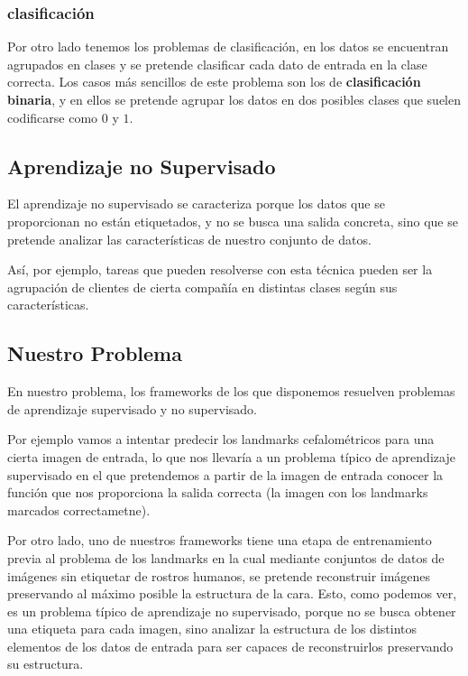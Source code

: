        \subsubsection{clasificación}
            \noindent Por otro lado tenemos los problemas de clasificación, en los datos se encuentran agrupados en clases y se pretende clasificar cada dato de entrada en la clase correcta. Los casos más sencillos de este problema son los de \textbf{clasificación binaria}, y en ellos se pretende agrupar los datos en dos posibles clases que suelen codificarse como $0$ y $1$.

    \subsection{Aprendizaje no Supervisado}
            \noindent El aprendizaje no supervisado se caracteriza porque los datos que se proporcionan no están etiquetados, y no se busca una salida concreta, sino que se pretende analizar las características de nuestro conjunto de datos. 

            Así, por ejemplo, tareas que pueden resolverse con esta técnica pueden ser la agrupación de clientes de cierta compañía en distintas clases según sus características.
            
    \subsection{Nuestro Problema}
        \noindent En nuestro problema, los frameworks de los que disponemos resuelven problemas de aprendizaje supervisado y no supervisado. 
        
        \medskip
        
        \noindent Por ejemplo vamos a intentar predecir los landmarks cefalométricos para una cierta imagen de entrada, lo que nos llevaría a un problema típico de aprendizaje supervisado en el que pretendemos a partir de la imagen de entrada conocer la función que nos proporciona la salida correcta (la imagen con los landmarks marcados correctametne).

        \medskip

        \noindent Por otro lado, uno de nuestros frameworks tiene una etapa de entrenamiento previa al problema de los landmarks en la cual mediante conjuntos de datos de imágenes sin etiquetar de rostros humanos, se pretende reconstruir imágenes preservando al máximo posible la estructura de la cara. Esto, como podemos ver, es un problema típico de aprendizaje no supervisado, porque no se busca obtener una etiqueta para cada imagen, sino analizar la estructura de los distintos elementos de los datos de entrada para ser capaces de reconstruirlos preservando su estructura.

